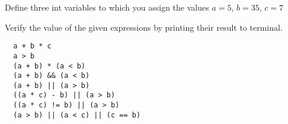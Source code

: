 
Define three int variables to which you assign the values
 $ a = 5 $,
 $ b = 35 $,
 $ c = 7 $

 Verify the value of the given expressions by printing their result to terminal.

\begin{verbatim}
  a + b * c
  a > b
  (a + b) * (a < b)
  (a + b) && (a < b)
  (a + b) || (a > b)
  ((a * c) - b) || (a > b)
  ((a * c) != b) || (a > b)
  (a > b) || (a < c) || (c == b)
\end{verbatim}

